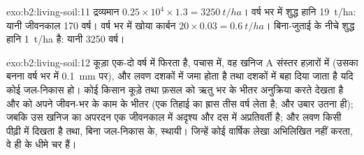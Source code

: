 \begin{solution}{exo:b2:living-soil:11}
द्रव्यमान $0.25\times 10^{4}\times 1.3 = \qty{3250}{t/ha}$। वर्ष भर में शुद्ध हानि
\qty{19}{t/ha}: यानी जीवनकाल 170 वर्ष। वर्ष भर में खोया कार्बन $20\times
0.03 = \qty{0.6}{t/ha}$। बिना-जुताई के नीचे शुद्ध हानि
\qty{1}{t/ha} है: यानी 3250 वर्ष।
\end{solution}

\begin{solution}{exo:b2:living-soil:12}
कूड़ा एक-दो वर्ष में फिरता है,  पचास में, वह खनिज A
संस्तर हज़ारों में (उसका बनना वर्ष भर में \qty{0.1}{mm} पर), और
लवण दशकों में जमा होता है तथा दशकों में बहा दिया जाता है यदि कोई
जल-निकास हो। कोई किसान कूड़े तथा फ़सल को ऋतु भर के भीतर अनुक्रिया करते
देखता है और  को अपने जीवन-भर के काम के भीतर (एक तिहाई का ह्रास
तीस वर्ष लेता है; और उबार उतना ही); जबकि उस खनिज  का अपरदन
एक जीवनकाल में अदृश्य और दस में अप्रतिवर्ती है; और लवण
किसी पीढ़ी में दिखता है तथा, बिना जल-निकास के, स्थायी। जिन्हें कोई वार्षिक लेखा
अभिलिखित नहीं करता, वे ही  के धीमे चर हैं।
\end{solution}

